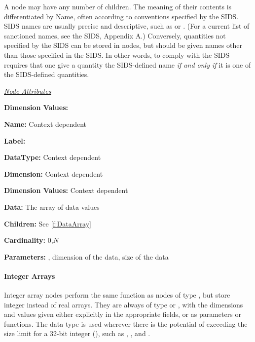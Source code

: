 A node may have any number of  children. The
meaning of their contents is differentiated by Name, often
according to conventions specified by the SIDS. SIDS names are
usually precise and descriptive, such as  or
. (For a current list of sanctioned names, see the
SIDS, Appendix A.) Conversely, quantities not specified by the SIDS can
be stored in  nodes, but should be given names other
than those specified in the SIDS. In other words, to comply with the
SIDS requires that one give a quantity the SIDS-defined name \emph{if
and only if} it is one of the SIDS-defined quantities.

\textit{\uline{Node Attributes}}
\begin{Ventryic}{\textbf{Dimension Values:}}
\item [\textbf{Name:}]
      Context dependent
\item [\textbf{Label:}]
\item [\textbf{DataType:}]
      Context dependent
\item [\textbf{Dimension:}]
      Context dependent
\item [\textbf{Dimension Values:}]
      Context dependent
\item [\textbf{Data:}]
      The array of data values
\item [\textbf{Children:}]
      See \autoref{f:DataArray}
\item [\textbf{Cardinality:}]
      0,$N$
\item [\textbf{Parameters:}]
      , dimension of the data, size of the data
\end{Ventryic}

\paragraph{Integer Arrays}

Integer array nodes perform the same function as nodes of type
, but store integer instead of real arrays. They are
always of type  or \fort{[]},
with the dimensions and values given either
explicitly in the appropriate fields, or as parameters or functions.
The  data type is used wherever
there is the potential of exceeding the size limit for a
32-bit integer (), such as ,
, and .

